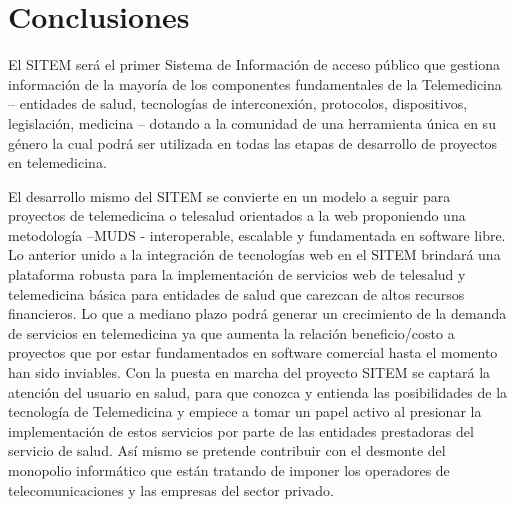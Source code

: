 \chapter*{Conclusiones}

El SITEM será el primer Sistema de Información de acceso público que gestiona información de la mayoría de los componentes fundamentales de la Telemedicina – entidades de salud, tecnologías de interconexión, protocolos, dispositivos, legislación, medicina – dotando a la comunidad de una herramienta única en su género la cual podrá ser utilizada en todas las etapas de desarrollo de proyectos en telemedicina.

El desarrollo mismo del SITEM se convierte en un modelo a seguir para proyectos de telemedicina o telesalud orientados a la web proponiendo una metodología –MUDS - interoperable, escalable y fundamentada en software libre. 
Lo anterior unido a la integración de tecnologías web en el SITEM brindará una plataforma robusta para la implementación de servicios web de telesalud y telemedicina básica para entidades de salud que carezcan de altos recursos financieros. Lo que a mediano plazo podrá generar un crecimiento de la demanda de servicios en telemedicina ya que aumenta la relación beneficio/costo a proyectos que por estar fundamentados en software comercial hasta el momento han sido inviables.
Con la puesta en marcha del proyecto SITEM se captará la atención del usuario en salud, para que conozca y entienda las posibilidades de la tecnología de Telemedicina y empiece a tomar un papel activo al presionar la implementación de estos servicios por parte de las entidades prestadoras del servicio de salud. Así mismo se pretende contribuir con el desmonte del monopolio informático que están tratando de imponer los operadores de telecomunicaciones y las empresas del sector privado.

